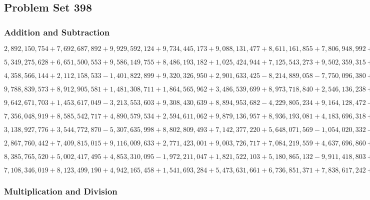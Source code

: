 \hypertarget{problem-set-398}{%
\subsection{Problem Set 398}\label{problem-set-398}}

\hypertarget{addition-and-subtraction}{%
\subsubsection{Addition and
Subtraction}\label{addition-and-subtraction}}

\(2,892,150,754+7,692,687,892+9,929,592,124+9,734,445,173+9,088,131,477+8,611,161,855+7,806,948,992+4,064,665,070+1,924,324,262+1,597,054,898\)

\(5,349,275,628+6,651,500,553+9,586,149,755+8,486,193,182+1,025,424,944+7,125,543,273+9,502,359,315+2,687,853,929+1,938,606,376+1,511,243,901\)

\(4,358,566,144+2,112,158,533-1,401,822,899+9,320,326,950+2,901,633,425-8,214,889,058-7,750,096,380+1,955,296,705+6,551,840,161-2,696,907,447\)

\(9,788,839,573+8,912,905,581+1,481,308,711+1,864,565,962+3,486,539,699+8,973,718,840+2,546,136,238+3,460,681,305+2,747,010,900+6,012,399,488\)

\(9,642,671,703+1,453,617,049-3,213,553,603+9,308,430,639+8,894,953,682-4,229,805,234+9,164,128,472-2,104,838,771-8,597,835,730+4,221,431,377\)

\(7,356,048,919+8,585,542,717+4,890,579,534+2,594,611,062+9,879,136,957+8,936,193,081+4,183,696,318+5,378,833,749+6,255,727,064+6,580,772,635\)

\(3,138,927,776+3,544,772,870-5,307,635,998+8,802,809,493+7,142,377,220+5,648,071,569-1,054,020,332-8,924,815,657-5,434,664,507+4,424,510,272\)

\(2,867,760,442+7,409,815,015+9,116,009,633+2,771,423,001+9,003,726,717+7,084,219,559+4,637,696,860+4,581,147,597+3,283,680,143+4,118,832,019\)

\(8,385,765,520+5,002,417,495+4,853,310,095-1,972,211,047+1,821,522,103+5,180,865,132-9,911,418,803+1,126,916,875-4,391,342,614-2,156,118,963\)

\(7,108,346,019+8,123,499,190+4,942,165,458+1,541,693,284+5,473,631,661+6,736,851,371+7,838,617,242+1,096,727,400+5,499,810,228+5,041,156,932\)

\hypertarget{multiplication-and-division}{%
\subsubsection{Multiplication and
Division}\label{multiplication-and-division}}

